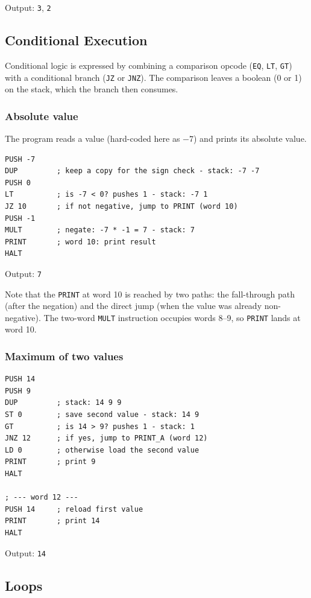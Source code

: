 Output: \texttt{3}, \texttt{2}

\subsection{Conditional Execution}

Conditional logic is expressed by combining a comparison opcode (\texttt{EQ}, \texttt{LT}, \texttt{GT}) with a conditional branch (\texttt{JZ} or \texttt{JNZ}). The comparison leaves a boolean (0 or 1) on the stack, which the branch then consumes.

\subsubsection*{Absolute value}

The program reads a value (hard-coded here as $-7$) and prints its absolute value.

\begin{lstlisting}
PUSH -7
DUP         ; keep a copy for the sign check - stack: -7 -7
PUSH 0
LT          ; is -7 < 0? pushes 1 - stack: -7 1
JZ 10       ; if not negative, jump to PRINT (word 10)
PUSH -1
MULT        ; negate: -7 * -1 = 7 - stack: 7
PRINT       ; word 10: print result
HALT
\end{lstlisting}

Output: \texttt{7}

Note that the \texttt{PRINT} at word 10 is reached by two paths: the fall-through path (after the negation) and the direct jump (when the value was already non-negative). The two-word \texttt{MULT} instruction occupies words 8--9, so \texttt{PRINT} lands at word 10.

\subsubsection*{Maximum of two values}

\begin{lstlisting}
PUSH 14
PUSH 9
DUP         ; stack: 14 9 9
ST 0        ; save second value - stack: 14 9
GT          ; is 14 > 9? pushes 1 - stack: 1
JNZ 12      ; if yes, jump to PRINT_A (word 12)
LD 0        ; otherwise load the second value
PRINT       ; print 9
HALT

; --- word 12 ---
PUSH 14     ; reload first value
PRINT       ; print 14
HALT
\end{lstlisting}

Output: \texttt{14}

\subsection{Loops}

